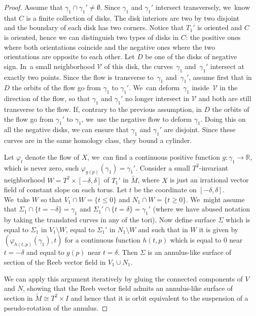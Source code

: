 \documentclass[11pt]{article}
\theoremstyle{definition}
\begin{document}
\begin{proof}
Assume that $\gamma_1\cap \gamma_1' \neq \emptyset$. Since $\gamma_1$ and $\gamma_1'$ intersect transversely, we~know that $C$ is a finite collection of disks. The disk interiors are two by two disjoint and the boundary of each disk has two corners. Notice that $T_1'$ is oriented and $C$ is oriented, hence we can distinguish two types of disks in $C$: the positive ones where both orientations coincide and the negative ones where the two orientations are opposite to each other.
Let $D$ be one of the disks of negative sign. In~a small neighborhood $\mathcal{V}$ of this disk, the curves~$\gamma_1$ and~$\gamma_1'$ intersect at exactly two points. Since the flow is transverse to~$\gamma_1$ and~$\gamma_1'$, assume first that in $D$ the orbits of the flow go from $\gamma_1$ to $\gamma_1'$. We~can deform~$\gamma_1$ inside~$\mathcal{V}$ in the direction of the flow, so that $\gamma_1$ and $\gamma_1'$ no longer intersect in $\mathcal{V}$ and both are still transverse to the flow. If, contrary to the previous assumption, in $D$ the orbits of the flow go from $\gamma_1'$ to $\gamma_1$, we~use the negative flow to deform $\gamma_1$. Doing this on all the negative disks,
we can ensure that $\gamma_1$ and $\gamma_1'$ are disjoint. Since these curves are in the same homology class, they bound a cylinder.

Let $\varphi_t$ denote the flow of $X$, we~can find a continuous positive function $g: \gamma_1 \to \mathbb{R}$, which is never zero, such $\varphi_{g(p)}(\gamma_1)=\gamma_1'$. Consider a small $T^2$-invariant neighborhood $W=T^2\times [-\delta,\delta]$ of $T_1'$ in $\widetilde M$, where $X$ is just an irrational vector field of constant slope on each torus. Let $t$ be the coordinate on $[-\delta, \delta]$. We~take $W$ so that $V_1\cap W= \{t\leq 0\}$ and $N_1\cap W=\{t\geq 0\}$. We~might assume that $\Sigma_1\cap \{t=-\delta\}=\gamma_1$ and $\Sigma_1'\cap \{t=\delta\}=\gamma_1'$ (where we have abused notation by taking the translated curves in any of the tori). Now define surface $\Sigma$ which is equal to $\Sigma_1$ in $V_1\setminus W$, equal to $\Sigma_1'$ in $N_1\setminus W$ and such that in $W$ it is given by $(\varphi_{h(t,p)}(\gamma_1),t)$ for a continuous function $h(t,p)$ which is equal to $0$ near $t=-\delta$ and equal to $g(p)$ near $t=\delta$. Then $\Sigma$ is an annulus-like surface of section of the Reeb vector field in $V_1\cup N_1$.

We can apply this argument iteratively by gluing the connected components of $V$ and $N$, showing that the Reeb vector field admits an annulus-like surface of section in $\widetilde{M} \cong T^2\times I$ and hence that it is orbit equivalent to the suspension of a pseudo-rotation of the annulus.
\end{proof}
\end{document}
